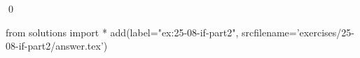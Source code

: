 
\begin{ex}
  \label{ex:25-08-if-part2}
  
  \qed
\end{ex}
\begin{python0}
from solutions import *
add(label="ex:25-08-if-part2",
    srcfilename='exercises/25-08-if-part2/answer.tex')
\end{python0}
